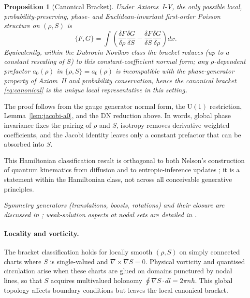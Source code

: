 \documentclass[11pt,a4paper]{article}
\numberwithin{equation}{section}
\theoremstyle{thmcompact}
\newtheorem{proposition}[theorem]{Proposition}
\theoremstyle{remark}
\begin{document}
\smallskip
\begin{proposition}[Canonical Bracket]\label{thm:canonical-bracket}
	Under Axioms~I-V, the only possible local, probability-preserving, phase- and Euclidean-invariant first-order Poisson structure on $(\rho,S)$ is
	\begin{equation}
		\boxed{\;
			\{F,G\}=\int
			\left(
			\frac{\delta F}{\delta \rho}\frac{\delta G}{\delta S}
			-\frac{\delta F}{\delta S}\frac{\delta G}{\delta \rho}
			\right)\!dx.
			\;}
		\label{eq:canonical}
	\end{equation}
Equivalently, within the Dubrovin-Novikov class the bracket reduces (up to a constant rescaling of $S$) to this constant-coefficient normal form; any $\rho$-dependent prefactor $a_0(\rho)$ in $\{\rho,S\}=a_0(\rho)$ is incompatible with the phase-generator property of Axiom~II and probability conservation, hence the canonical bracket \eqref{eq:canonical} is the unique local representative in this setting.
\end{proposition}


The proof follows from the gauge generator normal form, the $\mathrm{U}(1)
$ restriction, Lemma~\ref{lem:jacobi-a0}, and the DN reduction above. In words, global phase invariance fixes the pairing of $\rho$ and $S$, isotropy removes derivative-weighted coefficients, and the Jacobi identity leaves only a constant prefactor that can be absorbed into $S$.

This Hamiltonian classification result is orthogonal to both Nelson’s construction of quantum kinematics \cite{nelson1966} from diffusion and to entropic-inference updates \cite{caticha2012}; it is a statement within the Hamiltonian class, not across all conceivable generative principles.

\emph{Symmetry generators (translations, boosts, rotations) and their closure are discussed in ; weak-solution aspects at nodal sets are detailed in .}

\paragraph{Locality and vorticity.}
The bracket classification holds for locally smooth $(\rho,S)$ on simply connected charts where $S$ is single-valued and $\nabla\times\nabla S=0$.  Physical vorticity and quantised circulation arise when these charts are glued on domains punctured by nodal lines, so that $S$ acquires multivalued holonomy $\oint\nabla S\!\cdot\!dl=2\pi n\hbar$.  This global topology affects boundary conditions but leaves the local canonical bracket.
	
\end{document}
